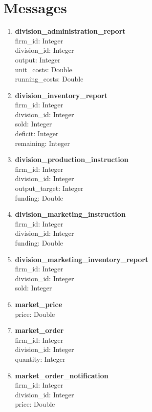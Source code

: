 \documentclass[11pt]{article}
\begin{document}
\section{Messages}
\begin{enumerate}
	\item \textbf{division\_administration\_report} \\
	firm\_id: Integer \\
	division\_id: Integer \\
	output: Integer \\
	unit\_costs: Double \\
	running\_costs: Double
	\item \textbf{division\_inventory\_report} \\
	firm\_id: Integer \\
	division\_id: Integer \\
	sold: Integer \\
	deficit: Integer \\
	remaining: Integer
	\item \textbf{division\_production\_instruction} \\
	firm\_id: Integer \\
	division\_id: Integer \\
	output\_target: Integer \\
	funding: Double
	\item \textbf{division\_marketing\_instruction} \\
	firm\_id: Integer \\
	division\_id: Integer \\
	funding: Double
	\item \textbf{division\_marketing\_inventory\_report} \\
	firm\_id: Integer \\
	division\_id: Integer \\
	sold: Integer
	\item \textbf{market\_price} \\
	price: Double
	\item \textbf{market\_order} \\
	firm\_id: Integer \\
	division\_id: Integer \\
	quantity: Integer
	\item \textbf{market\_order\_notification} \\
	firm\_id: Integer \\
	division\_id: Integer \\
	price: Double \\

\end{enumerate}
\end{document}
